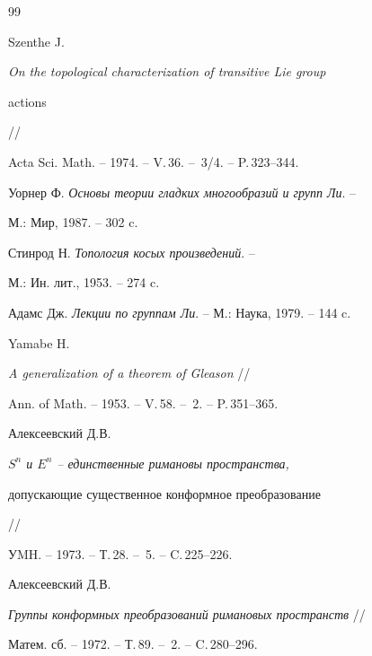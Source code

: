 \begin{thebibliography}{99}


Szenthe J.


 {\em On the topological characterization of transitive Lie group


actions} //


 Acta Sci. Math. -- 1974. -- V.\,36. -- \No\,3/4. -- P.\,323--344.







Уорнер Ф.  {\em Основы теории гладких многообразий и групп Ли}. --


 М.: Мир, 1987. -- 302 c.







Стинрод Н.  {\em Топология косых произведений}. --


 М.: Ин. лит., 1953. -- 274 c.







Адамс Дж. {\em Лекции по группам Ли}. --  М.: Наука, 1979. -- 144 c.







Yamabe H.


{\em A generalization of a theorem of Gleason} //


Ann. of Math. -- 1953. -- V.\,58. -- \No\,2. -- P.\,351--365.







Алексеевский Д.В.


 {\em $S^{n}$ и $E^{n}$ -- единственные римановы пространства,


допускающие существенное конформное преобразование} //


УMH. -- 1973. -- Т.\,28. -- \No\,5. -- C.\,225--226.







Алексеевский Д.В.


 {\em Группы конформных преобразований римановых пространств} //


 Матем. сб. -- 1972. -- Т.\,89. -- \No\,2. -- C.\,280--296.






\end{thebibliography}
